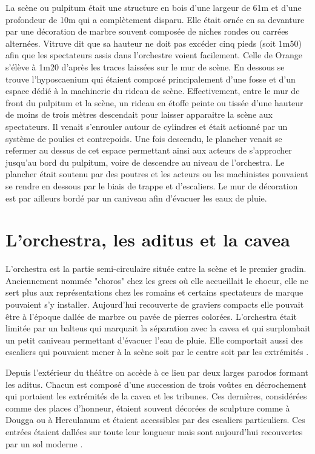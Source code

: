 		La scène ou \gls{pulpitum} était une structure en bois d'une largeur de 61m et d'une profondeur de 10m qui a complètement disparu. Elle était ornée en sa devanture par une décoration de marbre souvent composée de niches rondes ou carrées alternées. Vitruve dit que sa hauteur ne doit pas excéder cinq pieds (soit 1m50) afin que les spectateurs assis dans l'orchestre voient facilement. Celle de Orange s'élève à 1m20 d'après les traces laissées sur le mur de scène. En dessous se trouve l'hyposcaenium qui étaient composé principalement d'une fosse et d'un espace dédié à la machinerie du rideau de scène. Effectivement, entre le mur de front du \gls{pulpitum} et la scène, un rideau en étoffe peinte ou tissée d'une hauteur de moins de trois mètres descendait pour laisser apparaitre la scène aux spectateurs. Il venait s'enrouler autour de cylindres et était actionné par un système de poulies et contrepoids. Une fois descendu, le plancher venait se refermer au dessus de cet espace permettant ainsi aux acteurs de s'approcher jusqu'au bord du \gls{pulpitum}, voire de descendre au niveau de l'\gls{orchestra}. Le plancher était soutenu par des poutres et les acteurs ou les machinistes pouvaient se rendre en dessous par le biais de trappe et d'escaliers. Le mur de décoration est par ailleurs bordé par un caniveau afin d'évacuer les eaux de pluie.
						
		
\section{L'\gls{orchestra}, les \gls{aditus} et la \gls{cavea}}		
	
	L'\gls{orchestra} est la partie semi-circulaire située entre la scène et le premier gradin. Anciennement nommée "choros" chez les grecs où elle accueillait le choeur, elle ne sert plus aux représentations chez les romains et certains spectateurs de marque pouvaient s'y installer. Aujourd'hui recouverte de graviers compacts elle pouvait être à l'époque dallée de marbre ou pavée de pierres colorées. L'\gls{orchestra} était limitée par un \gls{balteus} qui marquait la séparation avec la \gls{cavea} et qui surplombait un petit caniveau permettant d'évacuer l'eau de pluie. Elle comportait aussi des escaliers qui pouvaient mener à la scène soit par le centre soit par les extrémités \citep[p. 52]{formige}.
	
	Depuis l'extérieur du théâtre on accède à ce lieu par deux larges \gls{parodos} formant les \gls{aditus}. Chacun est composé d'une succession de trois voûtes en décrochement qui portaient les extrémités de la \gls{cavea} et les tribunes. Ces dernières, considérées comme des places d'honneur, étaient souvent décorées de sculpture comme à Dougga ou à Herculanum et étaient accessibles par des escaliers particuliers. Ces entrées étaient dallées sur toute leur longueur mais sont aujourd'hui recouvertes par un sol moderne \cite[Pl. XVI]{orangePl}.
	
